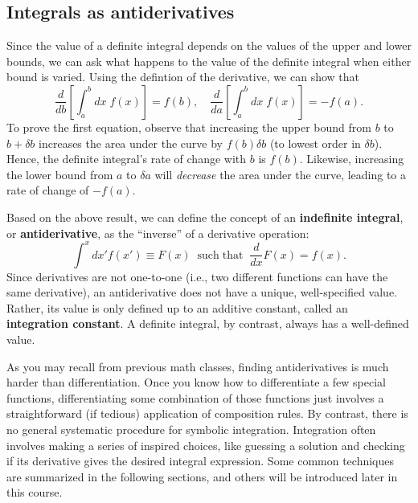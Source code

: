 \documentclass[10pt,a4paper]{article}
\begin{document}
\subsection{Integrals as antiderivatives}
\label{integrals-as-antiderivatives}

Since the value of a definite integral depends on the values of the
upper and lower bounds, we can ask what happens to the value of the
definite integral when either bound is varied. Using the defintion of
the derivative, we can show that
\begin{equation}
 \frac{d}{db} \left[\int_a^b dx\; f(x)\right] = f(b), \quad \frac{d}{da} \left[\int_a^b dx\; f(x)\right] = -f(a).
\end{equation}
To prove the first equation, observe that increasing the upper bound
from $b$ to $b + \delta b$ increases the area under the curve by
$f(b) \delta b$ (to lowest order in $\delta b$). Hence, the definite
integral's rate of change with $b$ is $f(b)$. Likewise, increasing
the lower bound from $a$ to $\delta a$ will \emph{decrease} the area
under the curve, leading to a rate of change of $-f(a)$.

Based on the above result, we can define the concept of an
\textbf{indefinite integral}, or \textbf{antiderivative}, as the
``inverse'' of a derivative operation:
\begin{equation}
\int^x dx' f(x') \equiv F(x) \;\;\mathrm{such}\;\mathrm{that}\;\; \frac{d}{dx}F(x) = f(x).
\end{equation}
Since derivatives are not one-to-one (i.e., two different functions can
have the same derivative), an antiderivative does not have a unique,
well-specified value. Rather, its value is only defined up to an
additive constant, called an \textbf{integration constant}. A definite
integral, by contrast, always has a well-defined value.

As you may recall from previous math classes, finding antiderivatives
is much harder than differentiation. Once you know how to
differentiate a few special functions, differentiating some
combination of those functions just involves a straightforward (if
tedious) application of composition rules. By contrast, there is no
general systematic procedure for symbolic integration. Integration
often involves making a series of inspired choices, like guessing a
solution and checking if its derivative gives the desired integral
expression. Some common techniques are summarized in the following
sections, and others will be introduced later in this course.
\end{document}
